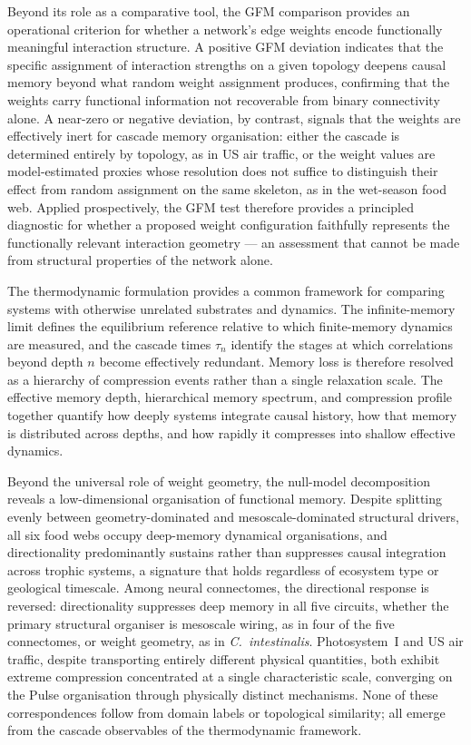 \documentclass[aps,superscriptaddress,11pt]{revtex4-2}
\theoremstyle{definition}
\theoremstyle{plain}
\begin{document}
Beyond its role as a comparative tool, the GFM comparison provides an
operational criterion for whether a network's edge weights encode
functionally meaningful interaction structure. A positive GFM deviation
indicates that the specific assignment of interaction strengths on a given
topology deepens causal memory beyond what random weight assignment
produces, confirming that the weights carry functional information not
recoverable from binary connectivity alone. A near-zero or negative
deviation, by contrast, signals that the weights are effectively inert for
cascade memory organisation: either the cascade is determined entirely by
topology, as in US air traffic, or the weight values are model-estimated
proxies whose resolution does not suffice to distinguish their effect from
random assignment on the same skeleton, as in the wet-season food web.
Applied prospectively, the GFM test therefore provides a principled
diagnostic for whether a proposed weight configuration faithfully represents
the functionally relevant interaction geometry --- an assessment that cannot
be made from structural properties of the network alone.

The thermodynamic formulation provides a common framework for comparing
systems with otherwise unrelated substrates and dynamics. The
infinite-memory limit defines the equilibrium reference relative to which
finite-memory dynamics are measured, and the cascade times $\tau_n$
identify the stages at which correlations beyond depth $n$ become
effectively redundant. Memory loss is therefore resolved as a hierarchy of
compression events rather than a single relaxation scale. The effective
memory depth, hierarchical memory spectrum, and compression profile
together quantify how deeply systems integrate causal history, how that
memory is distributed across depths, and how rapidly it compresses into
shallow effective dynamics.

Beyond the universal role of weight geometry, the null-model decomposition
reveals a low-dimensional organisation of functional memory. Despite
splitting evenly between geometry-dominated and mesoscale-dominated
structural drivers, all six food webs occupy deep-memory dynamical
organisations, and directionality predominantly sustains rather than
suppresses causal integration across trophic systems, a signature that
holds regardless of ecosystem type or geological timescale. Among neural
connectomes, the directional response is reversed: directionality
suppresses deep memory in all five circuits, whether the primary
structural organiser is mesoscale wiring, as in four of the five
connectomes, or weight geometry, as in \textit{C.~intestinalis}.
Photosystem~I and US air traffic, despite transporting entirely different
physical quantities, both exhibit extreme compression concentrated at a
single characteristic scale, converging on the Pulse organisation through
physically distinct mechanisms. None of these correspondences follow from
domain labels or topological similarity; all emerge from the cascade
observables of the thermodynamic framework.
\end{document}
